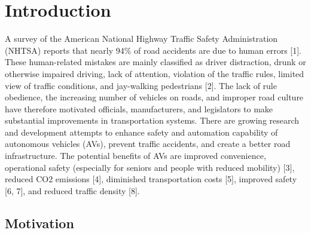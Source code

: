 \chapter*{Introduction}
\setcounter{page}{1}

\begin{chapterabstract}
	\lipsum[1]
\end{chapterabstract}

A survey of the American National Highway Traffic Safety Administration (NHTSA) reports that nearly 94\% of road accidents are due to human errors [1]. 
These human-related mistakes are mainly classified as driver distraction, drunk or otherwise impaired driving, lack of attention, violation of the traffic rules, limited view of traffic conditions, and jay-walking pedestrians [2]. 
The lack of rule obedience, the increasing number of vehicles on roads, and improper road culture have therefore motivated officials, manufacturers, and legislators to make substantial improvements in transportation systems. 
There are growing research and development attempts to enhance safety and automation capability of autonomous vehicles (AVs), prevent traffic accidents, and create a better road infrastructure. 
The potential benefits of AVs are improved convenience, operational safety (especially for seniors and people with reduced mobility) [3], reduced CO2 emissions [4], diminished transportation costs [5], improved safety [6, 7], and reduced traffic density [8].

\section{Motivation}

